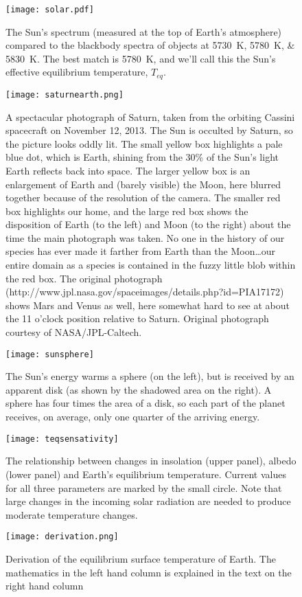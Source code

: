\documentclass[amstex,12pt]{book}
\begin{document}
\begin{figure}[p]
\centering
\texttt{[image: solar.pdf]}%
\caption{The Sun's spectrum (measured at the top of Earth's atmosphere) compared to the blackbody spectra of objects at \SIlist{5730;5780;5830}{\kelvin}. The best match is \SI{5780}{\kelvin}, and we'll call this the Sun's effective equilibrium temperature, $T_{eq}$. }
\label{fig:solar}
\end{figure}

\begin{figure}[p]
\centering
\texttt{[image: saturnearth.png]}%
\caption{A spectacular photograph of Saturn, taken from the orbiting Cassini spacecraft on November 12, 2013. The Sun is occulted by Saturn, so the picture looks oddly lit. The small yellow box highlights a pale blue dot, which is Earth, shining from the 30\% of the Sun’s light Earth reflects back into space. The larger yellow box is an enlargement of Earth and (barely visible) the Moon, here blurred together because of the resolution of the camera. The smaller red box highlights our home, and the large red box shows the disposition of Earth (to the left) and Moon (to the right) about the time the main photograph was taken. No one in the history of our species has ever made it farther from Earth than the Moon…our entire domain as a species is contained in the fuzzy little blob within the red box. The original photograph (http://www.jpl.nasa.gov/spaceimages/details.php?id=PIA17172) shows Mars and Venus as well, here somewhat hard to see at about the 11 o’clock position relative to Saturn. Original photograph courtesy of NASA/JPL-Caltech.}
\label{fig:saturnearth}
\end{figure}

\begin{figure}[p]
\centering
\texttt{[image: sunsphere]}%
\caption{The Sun's energy warms a sphere (on the left), but is received by an apparent disk (as shown by the shadowed area on the right). A sphere has four times the area of a disk, so each part of the planet receives, on average, only one quarter of the arriving energy.}
\label{fig:sunsphere}
\end{figure}

\begin{figure}[p]
\centering
\texttt{[image: teqsensativity]}%
\caption{The relationship between changes in insolation (upper panel), albedo (lower panel) and Earth's equilibrium temperature. Current values for all three parameters are marked by the small circle. Note that large changes in the incoming solar radiation are needed to produce moderate temperature changes.}
\label{fig:teqsensativity}
\end{figure}


\begin{figure}[p]
\centering
\texttt{[image: derivation.png]}%
\caption{Derivation of the equilibrium surface temperature of Earth. The mathematics in the left hand column is explained in the text on the right hand column}
\label{fig:teqderivation}
\end{figure}
\end{document}
